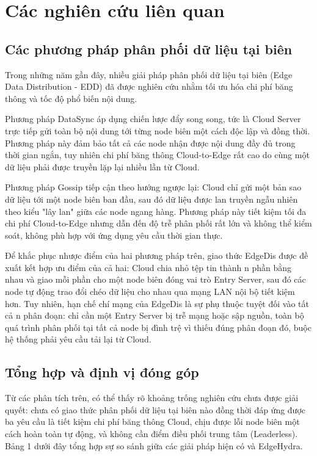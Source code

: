 \documentclass[11pt,a4paper]{article}
\begin{document}
\section{Các nghiên cứu liên quan}

\subsection{Các phương pháp phân phối dữ liệu tại biên}

Trong những năm gần đây, nhiều giải pháp phân phối dữ liệu tại biên (Edge Data Distribution - EDD) đã được nghiên cứu nhằm tối ưu hóa chi phí băng thông và tốc độ phổ biến nội dung.

Phương pháp DataSync áp dụng chiến lược đẩy song song, tức là Cloud Server trực tiếp gửi toàn bộ nội dung tới từng node biên một cách độc lập và đồng thời. Phương pháp này đảm bảo tất cả các node nhận được nội dung đầy đủ trong thời gian ngắn, tuy nhiên chi phí băng thông Cloud-to-Edge rất cao do cùng một dữ liệu phải được truyền lặp lại nhiều lần từ Cloud.

Phương pháp Gossip tiếp cận theo hướng ngược lại: Cloud chỉ gửi một bản sao dữ liệu tới một node biên ban đầu, sau đó dữ liệu được lan truyền ngẫu nhiên theo kiểu "lây lan" giữa các node ngang hàng. Phương pháp này tiết kiệm tối đa chi phí Cloud-to-Edge nhưng dẫn đến độ trễ phân phối rất lớn và không thể kiểm soát, không phù hợp với ứng dụng yêu cầu thời gian thực.

Để khắc phục nhược điểm của hai phương pháp trên, giao thức EdgeDis được đề xuất kết hợp ưu điểm của cả hai: Cloud chia nhỏ tệp tin thành n phần bằng nhau và giao mỗi phần cho một node biên đóng vai trò Entry Server, sau đó các node tự động trao đổi chéo dữ liệu cho nhau qua mạng LAN nội bộ tiết kiệm hơn. Tuy nhiên, hạn chế chí mạng của EdgeDis là sự phụ thuộc tuyệt đối vào tất cả n phân đoạn: chỉ cần một Entry Server bị trễ mạng hoặc sập nguồn, toàn bộ quá trình phân phối tại tất cả node bị đình trệ vì thiếu đúng phân đoạn đó, buộc hệ thống phải yêu cầu tải lại từ Cloud.

\subsection{Tổng hợp và định vị đóng góp}

Từ các phân tích trên, có thể thấy rõ khoảng trống nghiên cứu chưa được giải quyết: chưa có giao thức phân phối dữ liệu tại biên nào đồng thời đáp ứng được ba yêu cầu là tiết kiệm chi phí băng thông Cloud, chịu được lỗi node biên một cách hoàn toàn tự động, và không cần điểm điều phối trung tâm (Leaderless). Bảng 1 dưới đây tổng hợp sự so sánh giữa các giải pháp hiện có và EdgeHydra.
\end{document}
